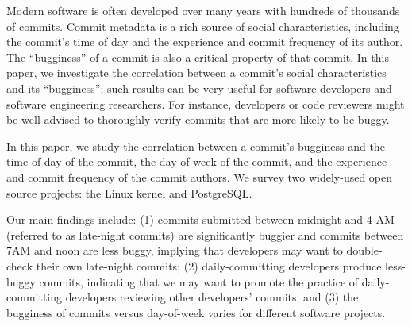 
Modern software is often developed over many years with hundreds of
thousands of commits. Commit metadata is a rich source of social
characteristics, including the commit's time of day and the
experience and commit frequency of its author.  The ``bugginess'' of a
commit is also a critical property of that commit. In this paper, we
investigate the correlation between a commit's social characteristics
and its ``bugginess''; such results can be very useful for software
developers and software engineering researchers. For instance,
developers or code reviewers might be well-advised to thoroughly
verify commits that are more likely to be buggy.

In this paper, we study the correlation between a commit's bugginess
and the time of day of the commit, the day of week of the commit, and
the experience and commit frequency of the commit authors.  We
survey two widely-used open source projects: the Linux kernel and
PostgreSQL.  

Our main findings include: (1) commits submitted between midnight and
4 AM (referred to as late-night commits) are significantly buggier 
and commits between 7AM and noon are less buggy, implying that developers 
may want to double-check their own late-night commits; 
(2) daily-committing developers produce less-buggy commits, indicating that we may 
want to promote the practice of daily-committing developers reviewing other 
developers' commits; and (3) the bugginess of
commits versus day-of-week
varies for different software projects.
